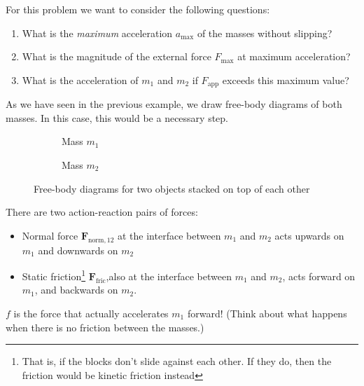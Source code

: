 For this problem we want to consider the following questions:
\begin{enumerate}[itemsep=6pt]
\item What is the \emph{maximum} acceleration $a_\text{max}$ of the masses
  without slipping?
\item What is the magnitude of the external force $F_\text{max}$ at maximum
  acceleration?
\item What is the acceleration of $m_1$ and $m_2$ if $F_\text{app}$ exceeds this
  maximum value?
\end{enumerate}
As we have seen in the previous example, we draw free-body diagrams of both
masses. In this case, this would be a necessary step.
\begin{figure}[ht]
  \centering
  \begin{subfigure}{.4\textwidth}
    \centering
    \caption{Mass $m_1$}
  \end{subfigure}
  \begin{subfigure}{.4\textwidth}
    \centering
     \caption{Mass $m_2$}
  \end{subfigure}
  \caption{Free-body diagrams for two objects stacked on top of each other}
\end{figure}
There are two action-reaction pairs of forces:
\begin{itemize}
\item Normal force $\bm F_{\text{norm},12}$ at the interface between $m_1$ and
  $m_2$ acts upwards on $m_1$ and downwards on $m_2$
\item Static friction\footnote{That is, if the blocks don't slide against each
other. If they do, then the friction would be kinetic friction instead}
  $\bm F_\text{fric}$,also at the interface between $m_1$ and $m_2$, acts
  forward on $m_1$, and backwards on $m_2$.
\end{itemize}
$f$ is the force that actually accelerates $m_1$ forward! (Think about
what happens when there is no friction between the masses.)

